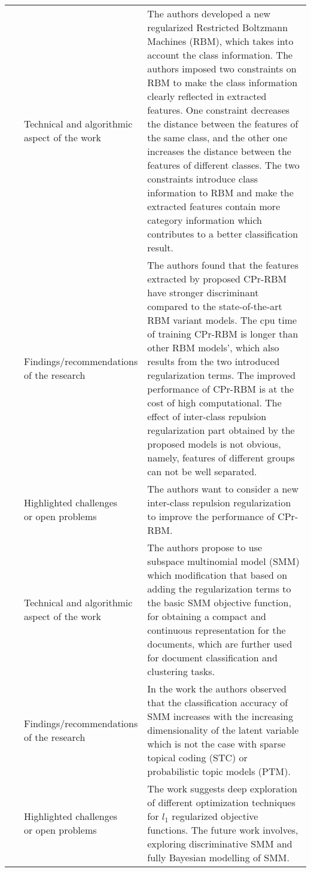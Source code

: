 \begin{landscape}
\begin{longtable}{lp{}p{}}
    \multirow{3}[10]{*}{~\citep{Hu2017}} & 
    \specialcell{Technical and algorithmic \\ aspect of the work} & 
    The authors developed a new regularized Restricted Boltzmann Machines (RBM), which takes into account the class information. The authors imposed two constraints on RBM to make the class information clearly reflected in extracted features. One constraint decreases the distance between the features of the same class, and the other one increases the distance between the features of different classes. The two constraints introduce class information to RBM and make the extracted features contain more category information which contributes to a better classification result.   
    \\ & 
    \specialcell{Findings/recommendations \\ of the research} & 
	The authors found that the features extracted by proposed CPr-RBM have stronger discriminant compared to the state-of-the-art RBM variant models. The cpu time of training CPr-RBM is longer than other RBM models’, which also results from the two introduced regularization terms. The improved performance of CPr-RBM is at the cost of high computational. The effect of inter-class repulsion regularization part obtained by the proposed models is not obvious, namely, features of different groups can not be well separated.  	
	\\ & 
	\specialcell{Highlighted challenges \\ or open problems} & 
	The authors want to consider a new inter-class repulsion regularization to improve the performance of CPr-RBM. 
	\\
	
	\multirow{3}[0]{*}{~\citep{Kesiraju2016}} & 
    \specialcell{Technical and algorithmic \\ aspect of the work} &
	The authors propose to use subspace multinomial model (SMM) which modification that based on adding the regularization terms to the basic SMM objective function, for obtaining a compact and continuous representation for the documents, which are further used for document classification and clustering tasks.   
    \\ & 
    \specialcell{Findings/recommendations \\ of the research} & 
	In the work the authors observed that the classification accuracy of SMM increases with the increasing dimensionality of the latent variable which is not the case with sparse topical coding (STC) or probabilistic topic models (PTM).
    \\ & 
    \specialcell{Highlighted challenges \\ or open problems} & 
    The work suggests deep exploration of different optimization techniques for $l_1$ regularized objective functions. The future work involves, exploring discriminative SMM and fully Bayesian modelling of SMM.
	\\
	

\end{longtable}
\end{landscape}
